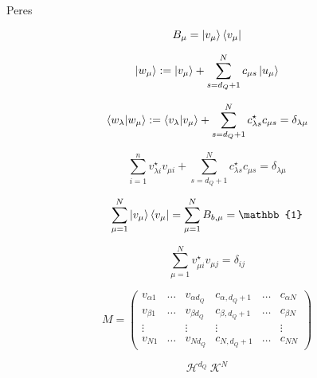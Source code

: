Peres \cite{peres1995}

\begin{equation}
B_{\mu} = \ket{v_{\mu}} \bra{v_{\mu}}
\end{equation}

\begin{equation}
\ket{w_{\mu}} := \ket{v_{\mu}} + \sum_{s=d_{Q}+1}^{N} c_{\mu s} \ket{u_{\mu}}
\end{equation}

\begin{equation}
\bra{w_{\lambda}} \ket{w_{\mu}} := \bra{v_{\lambda}} \ket{v_{\mu}} + \sum_{s=d_{Q}+1}^{N} c_{\lambda s}^{\star} c_{\mu s} = \delta_{\lambda \mu}
\end{equation}

\begin{equation}
\sum_{i=1}^{n} v_{\lambda i}^{\star} v_{\mu i} + \sum_{s=d_{Q}+1}^{N} c_{\lambda s}^{\star} c_{\mu s} = \delta_{\lambda \mu}
\end{equation}

\begin{equation}
\sum_{\mu=1}^{N}\ket{v_{\mu}}\bra{v_{\mu}} = \sum_{\mu=1}^{N} B_{b,\mu} = \mathbb{1}
\end{equation}


\begin{equation}
\sum_{\mu=1}^{N}v_{\mu i}^{\star} v_{\mu j} = \delta_{ij}
\end{equation}

\begin{equation}
M = 
\begin{pmatrix}
v_{\alpha 1} & \dots & v_{\alpha d_{Q}} & c_{\alpha,d_{Q}+1} & \dots & c_{\alpha N} \\
v_{\beta 1} & \dots & v_{\beta d_{Q}} & c_{\beta,d_{Q}+1} & \dots & c_{\beta N} \\
\vdots &  & \vdots & \vdots &  & \vdots \\
v_{N1} & \dots & v_{Nd_{Q}} & c_{N,d_Q+1} & \dots & c_{NN}
\end{pmatrix}    
\end{equation}

\[\mathcal{H}^{d_Q}\ \mathcal{K}^{N}\]